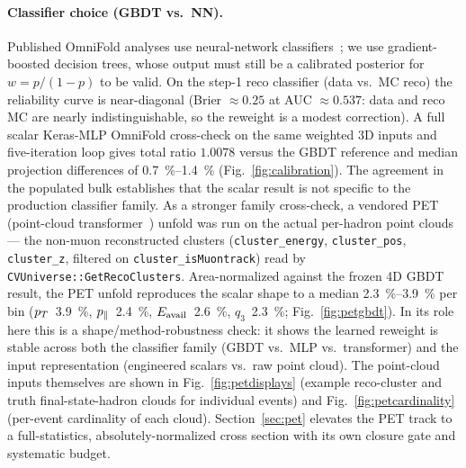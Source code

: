 \paragraph{Classifier choice (GBDT vs.\ NN).}  
Published OmniFold analyses use neural-network
classifiers~\cite{Andreassen:2019cjw,unbinnedguide}; we use gradient-boosted decision
trees, whose output must still be a calibrated posterior for $w=p/(1-p)$ to be valid.
On the step-1 reco classifier (data vs.\ MC reco) the reliability curve is near-diagonal
(Brier \(\approx0.25\) at AUC \(\approx0.537\): data and reco MC are nearly
indistinguishable, so the reweight is a modest correction). A full scalar
Keras-MLP OmniFold cross-check on the same weighted 3D inputs and five-iteration
loop gives total ratio $1.0078$ versus the GBDT reference and median projection
differences of \SIrange{0.7}{1.4}{\percent} (Fig.~\ref{fig:calibration}).
The agreement in the populated bulk establishes that the scalar result is not
specific to the production classifier family. As a stronger family cross-check, a vendored
PET (point-cloud transformer~\cite{Mikuni:2024qsr}) unfold was run on the actual
per-hadron point clouds --- the non-muon reconstructed clusters
(\texttt{cluster\_energy}, \texttt{cluster\_pos}, \texttt{cluster\_z}, filtered on
\texttt{cluster\_isMuontrack}) read by \texttt{CVUniverse::GetRecoClusters}.
Area-normalized against the frozen 4D GBDT result, the PET unfold
reproduces the scalar shape to a median \SIrange{2.3}{3.9}{\percent} per bin
($p_{T}$~\SI{3.9}{\percent}, $p_{\parallel}$~\SI{2.4}{\percent}, $E_{\mathrm{avail}}$~\SI{2.6}{\percent},
$q_{3}$~\SI{2.3}{\percent}; Fig.~\ref{fig:petgbdt}). In its role here this is a
shape/method-robustness check: it shows the learned reweight is stable across both
the classifier family (GBDT vs.\ MLP vs.\ transformer) and the input representation
(engineered scalars vs.\ raw point cloud). The point-cloud inputs themselves are
shown in Fig.~\ref{fig:petdisplays} (example reco-cluster and truth
final-state-hadron clouds for individual events) and Fig.~\ref{fig:petcardinality}
(per-event cardinality of each cloud). Section~\ref{sec:pet} elevates the PET
track to a full-statistics, absolutely-normalized cross section with its own
closure gate and systematic budget.

